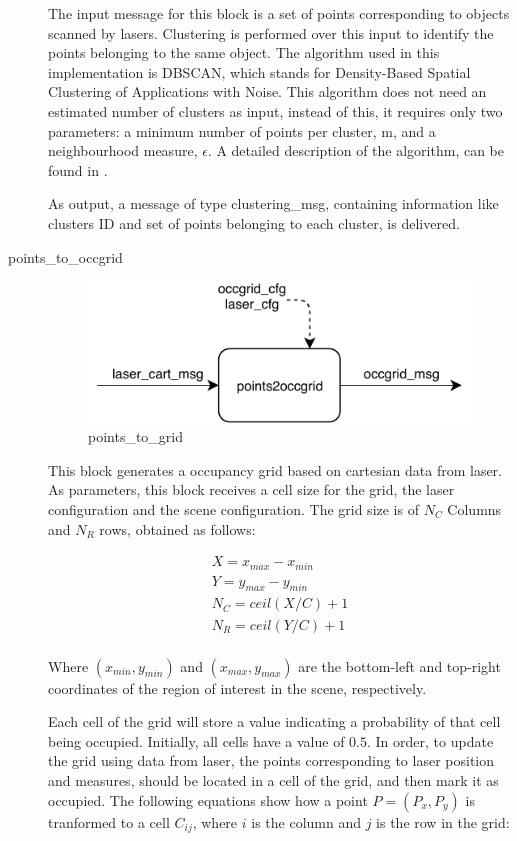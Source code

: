 \begin{description}
The input message for this block is a set of points corresponding to objects scanned by lasers. Clustering is performed over this input to identify the points belonging to the same object. The algorithm used in this implementation is DBSCAN, which stands for Density-Based Spatial Clustering of Applications with Noise. This algorithm does not need an estimated number of clusters as input, instead of this, it requires only two parameters: a minimum number of points per cluster, m, and a neighbourhood measure, $\epsilon$. A detailed description of the algorithm, can be found in \cite{Ester96}.

As output, a message of type clustering\_msg, containing information like clusters ID and set of points belonging to each cluster, is delivered.

\item[points\_to\_occgrid] \hfill

\begin{figure}[ht!]
\centering
\includegraphics[scale=0.8]{fig/3/points_to_grid.pdf}
\caption{points\_to\_grid}
\label{points_to_grid}
\end{figure}

This block generates a occupancy grid based on cartesian data from laser. As parameters, this block receives a cell size for the grid, the laser configuration and the scene configuration. The grid size is of $N_C$ Columns and $N_R$ rows, obtained as follows:

\begin{eqnarray*}
X = x_{max}-x_{min} \\
Y = y_{max}-y_{min} \\
N_C = ceil(X/C)+1 \\
N_R = ceil(Y/C)+1 \\
\end{eqnarray*}

Where $(x_{min}, y_{min})$ and $(x_{max}, y_{max})$ are the bottom-left and top-right coordinates of the region of interest in the scene, respectively.

Each cell of the grid will store a value indicating a probability of that cell being occupied. Initially, all cells have a value of $0.5$. In order, to update the grid using data from laser, the points corresponding to laser position and measures, should be located in a cell of the grid, and then mark it as occupied. The following equations show how a point $P = (P_x, P_y)$ is tranformed to a cell $C_{ij}$, where $i$ is the column and $j$ is the row in the grid:


\end{description}
